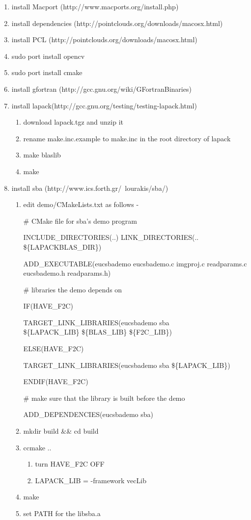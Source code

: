 \documentclass[12pt]{article}
\begin{document}
\begin{enumerate}
	\item{} install Macport (http://www.macports.org/install.php) 
	\item{} install dependencies (http://pointclouds.org/downloads/macosx.html)
	\item{} install PCL (http://pointclouds.org/downloads/macosx.html)
	\item{} sudo port install opencv
	\item{} sudo port install cmake
	\item{} install gfortran (http://gcc.gnu.org/wiki/GFortranBinaries)
	\item{} install lapack(http://gcc.gnu.org/testing/testing-lapack.html)
	\begin{enumerate}
		\item{} download lapack.tgz and unzip it
		\item{} rename make.inc.example to make.inc in the root directory of lapack 
		\item{} make blaslib
		\item{} make
	\end{enumerate}
	\item{} install sba (http://www.ics.forth.gr/~lourakis/sba/) 
	\begin{enumerate}
		\item{edit demo/CMakeLists.txt as follows} -
		
			\# CMake file for sba's demo program

			INCLUDE\_DIRECTORIES(..)
			LINK\_DIRECTORIES(.. \$\{LAPACKBLAS\_DIR\})

			ADD\_EXECUTABLE(eucsbademo eucsbademo.c imgproj.c readparams.c eucsbademo.h readparams.h)
			
			\# libraries the demo depends on
			
			IF(HAVE\_F2C)
			
				TARGET\_LINK\_LIBRARIES(eucsbademo sba \\\$\{LAPACK\_LIB\} \$\{BLAS\_LIB\} \$\{F2C\_LIB\})
				
			ELSE(HAVE\_F2C)
			
				TARGET\_LINK\_LIBRARIES(eucsbademo sba \$\{LAPACK\_LIB\})
				
			ENDIF(HAVE\_F2C)

			\# make sure that the library is built before the demo

			ADD\_DEPENDENCIES(eucsbademo sba)

		\item{mkdir build \&\& cd build}
		\item{ccmake ..}
		\begin{enumerate}
			\item{turn HAVE\_F2C OFF}
			\item{LAPACK\_LIB = -framework vecLib}
		\end{enumerate}
		\item{make}
		\item{set PATH for the libsba.a}
	\end{enumerate}
\end{enumerate}
\end{document}
